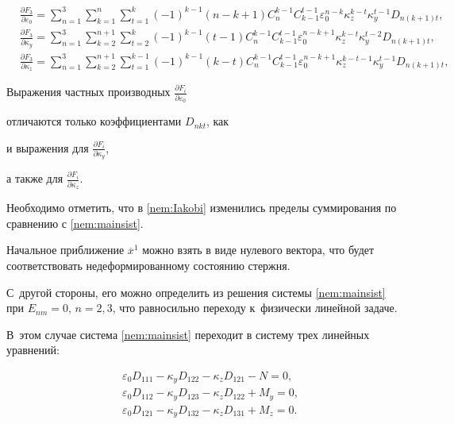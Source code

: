 \begin{equation}

\begin{aligned}

&\frac{\partial F_3 }{\partial \varepsilon_0}=\sum_{n=1}^3\sum_{k=1}^n\sum_{t=1}^k(-1)^{k-1}\left(n-k+1\right)C_n^{k-1}C_{k-1}^{t-1}\varepsilon_0^{n-k} \kappa_z^{k-t}\kappa_y^{t-1}D_{n\left(k+1\right)t},~~~~~ \\

&\frac{\partial F_3 }{\partial \kappa_y}=\sum_{n=1}^3\sum_{k=2}^{n+1}\sum_{t=2}^k(-1)^{k-1}\left(t-1\right)C_n^{k-1}C_{k-1}^{t-1}\varepsilon_0^{n-k+1} \kappa_z^{k-t}\kappa_y^{t-2}D_{n\left(k+1\right)t}, \\

&\frac{\partial F_3 }{\partial \kappa_z}=\sum_{n=1}^3\sum_{k=2}^{n+1}\sum_{t=1}^{k-1}(-1)^{k-1}\left(k-t\right)C_n^{k-1}C_{k-1}^{t-1}\varepsilon_0^{n-k+1} \kappa_z^{k-t-1}\kappa_y^{t-1}D_{n\left(k+1\right)t},

\end{aligned}

\end{equation}



Выражения частных производных $\frac{\partial F_i }{\partial \varepsilon_0}$  

отличаются только коэффициентами $D_{nkt}$, как 

и выражения для $\frac{\partial F_i }{\partial \kappa_y}$, 

а также для $\frac{\partial F_i }{\partial \kappa_z}$.

Необходимо отметить, что в \eqref{nem:Iakobi} изменились пределы суммирования по сравнению с \eqref{nem:mainsist}.



Начальное приближение $\overline {x}^1$ можно взять в виде нулевого вектора, что будет соответствовать недеформированному состоянию стержня. 

С~другой стороны, его можно определить из решения системы \eqref{nem:mainsist} при $E_{nm}=0$, ${n=2,3}$, что равносильно переходу к~физически линейной задаче. 

В~этом случае система \eqref{nem:mainsist} переходит в систему трех линейных уравнений:

\begin{equation}\label{nem:mainsistlin}

\begin{aligned}

&\varepsilon_0D_{111}-\kappa_yD_{122}-\kappa_zD_{121}-N=0,\\

&\varepsilon_0D_{112}-\kappa_yD_{123}-\kappa_zD_{122}+M_y=0,\\

&\varepsilon_0D_{121}-\kappa_yD_{132}-\kappa_zD_{131}+M_z=0.\\

\end{aligned}

\end{equation}

